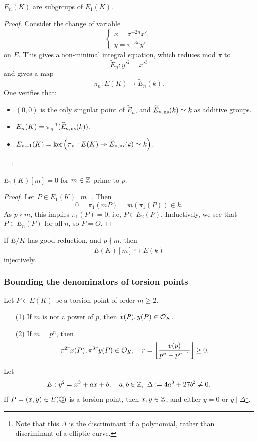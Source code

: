 \begin{lemma}
    $E_n(K)$ are subgroups of $E_1(K)$.
\end{lemma}
\begin{proof}
    Consider the change of variable \[\begin{cases}
        x = \pi^{-2n}x', \\ y = \pi^{-3n}y'
    \end{cases}\] on $E$.
    This gives a non-minimal integral equation,
    which reduces mod $\pi$ to \[\tilde{E}_n : y'^2 = x'^3\] and gives a map \[\pi_n : E(K)\to \tilde{E}_n(k).\]
    One verifies that:
\begin{itemize}
    \item $(0, 0)$ is the only singular point of $\tilde{E}_n$, and $\widetilde{E}_{n, \mathrm{ns}}(k)\simeq k$ as additive groups.
    \item $E_n(K) = \pi_n^{-1}(\widetilde{E}_{n, \mathrm{ns}}(k))$.
    \item $E_{n+1}(K) = \ker\left( \pi_n : E(K)\twoheadrightarrow \widetilde{E}_{n, \mathrm{ns}}(k)\simeq k \right)$.\qedhere
\end{itemize}
\end{proof}

\begin{proposition}
$E_1(K)[m] = 0$ for $m\in\mathbb{Z}$ prime to $p$.
\end{proposition}
\begin{proof}
    Let $P\in E_1(K)[m]$.
    Then \[ 0 = \pi_1(mP) = m(\pi_1(P))\in k.\]
    As $p\nmid m$, this implies $\pi_1(P) = 0$,
    i.e, $P\in  E_2(P)$.
    Inductively, we see that $P\in E_n(P)$ for all $n$, so $P = O$.
\end{proof}
    
\begin{corollary}
    If $E/K$ has good reduction, and $p\nmid m$,
    then \[E(K)[m]\hookrightarrow \tilde{E}(k)\] injectively.
\end{corollary}

\subsubsection*{Bounding the denominators of torsion points}

\begin{theorem}
    Let $P\in E(K)$ be a torsion point of order $m\ge 2$.
    \begin{enumerate}
\item [(1)] If $m$ is not a power of $p$,
then $x(P), y(P)\in\mathcal{O}_K$.
\item [(2)] If $m = p^n$,
then \[\pi^{2r}x(P), \pi^{3r}y(P)\in\mathcal{O}_K,\quad r = \left\lfloor  \frac{v(p)}{p^n - p^{n-1}}\right\rfloor\ge 0.\]
    \end{enumerate}
\end{theorem}

\begin{theorem}
    Let\[E : y^2 = x^3 + ax + b,\quad a, b\in\mathbb{Z},\ \Delta := 4a^3 + 27b^2\ne 0.\]
    If $P = (x, y)\in E(\mathbb{Q})$ is a torsion point,
    then $x, y\in\mathbb{Z}$, and either $y = 0$ or $y\mid \Delta$\footnote{Note that this $\Delta$ is the discriminant of a polynomial, rather than discriminant of a elliptic curve.}.
\end{theorem}

